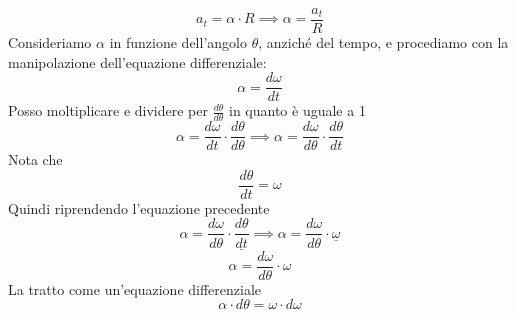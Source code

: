 \documentclass{article}
\begin{document}
\begin{enumerate}[label=\arabic*]
\begin{enumerate}[label=\alph*)]
\begin{equation*}
                        \boxed{a_t = \alpha \cdot R} \implies \boxed{\alpha = \frac{a_t}{R}}
                    \end{equation*}
                    Consideriamo \( \alpha \) in funzione dell'angolo \( \theta \), anziché del tempo, e procediamo con la manipolazione dell'equazione differenziale:
                    \begin{equation*}
                        \alpha = \frac{d\omega}{dt}
                    \end{equation*}
                    Posso moltiplicare e dividere per \( \frac{d\theta}{d\theta} \) in quanto è uguale a 1
                    \begin{equation*}
                        \alpha = \frac{d\omega}{dt} \cdot \frac{d\theta}{d\theta}  \implies \alpha = \frac{d\omega}{d\theta} \cdot \frac{d\theta}{dt}
                    \end{equation*}
                    Nota che
                    \begin{equation*}
                        \frac{d\theta}{dt} = \omega
                    \end{equation*}
                    Quindi riprendendo l'equazione precedente
                    \begin{equation*}
                        \alpha = \frac{d\omega}{d\theta} \cdot \underline{\frac{d\theta}{dt}} \implies \alpha = \frac{d\omega}{d\theta} \cdot \underline{\omega}
                    \end{equation*}
                    \begin{equation*}
                        \alpha = \frac{d\omega}{d\theta} \cdot \omega
                    \end{equation*}
                    La tratto come un'equazione differenziale
                    \begin{equation*}
                        \alpha \cdot d\theta = \omega \cdot d\omega
                    \end{equation*}


\end{enumerate}
\end{enumerate}
\end{document}
